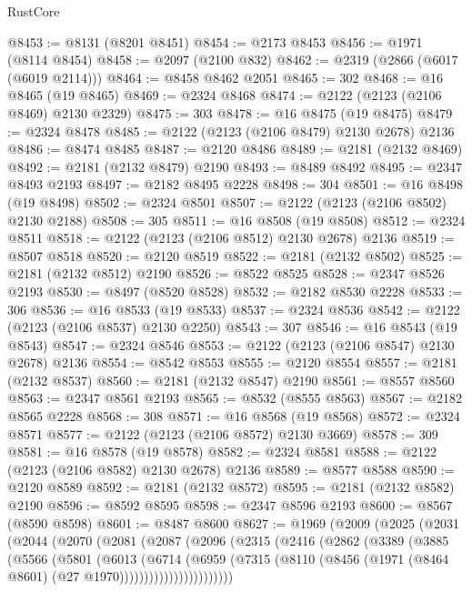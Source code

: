 \begin{lexlean}{RustCore}
\begin{coremodule}
@8453 := @8131 (@8201 @8451)
@8454 := @2173 @8453
@8456 := @1971 (@8114 @8454)
@8458 := @2097 (@2100 @832)
@8462 := @2319 (@2866 (@6017 (@6019 @2114)))
@8464 := @8458 @8462 @2051
@8465 := 302
@8468 := @16 @8465 (@19 @8465)
@8469 := @2324 @8468
@8474 := @2122 (@2123 (@2106 @8469) @2130 @2329)
@8475 := 303
@8478 := @16 @8475 (@19 @8475)
@8479 := @2324 @8478
@8485 := @2122 (@2123 (@2106 @8479) @2130 @2678) @2136
@8486 := @8474 @8485
@8487 := @2120 @8486
@8489 := @2181 (@2132 @8469)
@8492 := @2181 (@2132 @8479) @2190
@8493 := @8489 @8492
@8495 := @2347 @8493 @2193
@8497 := @2182 @8495 @2228
@8498 := 304
@8501 := @16 @8498 (@19 @8498)
@8502 := @2324 @8501
@8507 := @2122 (@2123 (@2106 @8502) @2130 @2188)
@8508 := 305
@8511 := @16 @8508 (@19 @8508)
@8512 := @2324 @8511
@8518 := @2122 (@2123 (@2106 @8512) @2130 @2678) @2136
@8519 := @8507 @8518
@8520 := @2120 @8519
@8522 := @2181 (@2132 @8502)
@8525 := @2181 (@2132 @8512) @2190
@8526 := @8522 @8525
@8528 := @2347 @8526 @2193
@8530 := @8497 (@8520 @8528)
@8532 := @2182 @8530 @2228
@8533 := 306
@8536 := @16 @8533 (@19 @8533)
@8537 := @2324 @8536
@8542 := @2122 (@2123 (@2106 @8537) @2130 @2250)
@8543 := 307
@8546 := @16 @8543 (@19 @8543)
@8547 := @2324 @8546
@8553 := @2122 (@2123 (@2106 @8547) @2130 @2678) @2136
@8554 := @8542 @8553
@8555 := @2120 @8554
@8557 := @2181 (@2132 @8537)
@8560 := @2181 (@2132 @8547) @2190
@8561 := @8557 @8560
@8563 := @2347 @8561 @2193
@8565 := @8532 (@8555 @8563)
@8567 := @2182 @8565 @2228
@8568 := 308
@8571 := @16 @8568 (@19 @8568)
@8572 := @2324 @8571
@8577 := @2122 (@2123 (@2106 @8572) @2130 @3669)
@8578 := 309
@8581 := @16 @8578 (@19 @8578)
@8582 := @2324 @8581
@8588 := @2122 (@2123 (@2106 @8582) @2130 @2678) @2136
@8589 := @8577 @8588
@8590 := @2120 @8589
@8592 := @2181 (@2132 @8572)
@8595 := @2181 (@2132 @8582) @2190
@8596 := @8592 @8595
@8598 := @2347 @8596 @2193
@8600 := @8567 (@8590 @8598)
@8601 := @8487 @8600
@8627 := @1969
    (@2009
      (@2025
        (@2031
          (@2044
            (@2070
              (@2081
                (@2087
                  (@2096
                    (@2315
                      (@2416
                        (@2862
                          (@3389
                            (@3885
                              (@5566
                                (@5801
                                  (@6013
                                    (@6714
                                      (@6959
                                        (@7315
                                          (@8110
                                            (@8456
                                              (@1971 (@8464 @8601) (@27 @1970)))))))))))))))))))))))

\end{coremodule}
\end{lexlean}

